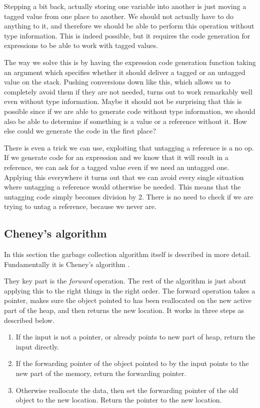 \documentclass{scrartcl}
\begin{document}
Stepping a bit back, actually storing one variable into another is just
moving a tagged value from one place to another. We should not actually
have to do anything to it, and therefore we should be able to perform
this operation without type information. This is indeed possible, but
it requires the code generation for expressions to be able to work 
with tagged values.

The way we solve this is by having the expression code generation
function taking an argument which specifies whether it should deliver
a tagged or an untagged value on the stack. Pushing conversions down
like this, which allows us to completely avoid them if they are not
needed, turns out to work remarkably well even without type
information. Maybe it should not be surprising that this is 
possible since if we are able to generate code without type information,
we should also be able to determine if something is a value or a 
reference without it. How else could we generate the code in the
first place?

There is even a trick we can use, exploiting that untagging a reference
is a no op. If we generate code for an expression and we know that it
will result in a reference, we can ask for a tagged value even if we
need an untagged one. Applying this everywhere it turns out that we
can avoid every single situation where untagging a reference would
otherwise be needed. This means that the untagging code simply becomes
division by 2. There is no need to check if we are trying to untag a
reference, because we never are.

\subsection{Cheney's algorithm}

In this section the garbage collection algorithm itself is described
in more detail. Fundamentally it is Cheney's algorithm \cite{cheney}.

They key part is the \emph{forward} operation. The rest of the algorithm
is just about applying this to the right things in the right order.
The forward operation takes a pointer, makes sure the object pointed
to has been reallocated on the new active part of the heap, and then
returns the new location. It works in three steps as described below.

\begin{enumerate}
\item If the input is not a pointer, or already points to new part of
 heap, return the input directly.
\item If the forwarding pointer of the object pointed to by the input
 points to the new part of the memory, return the forwarding pointer.
\item Otherwise reallocate the data, then set the forwarding pointer of
 the old object to the new location. Return the pointer to the new location.
\end{enumerate}
\end{document}

